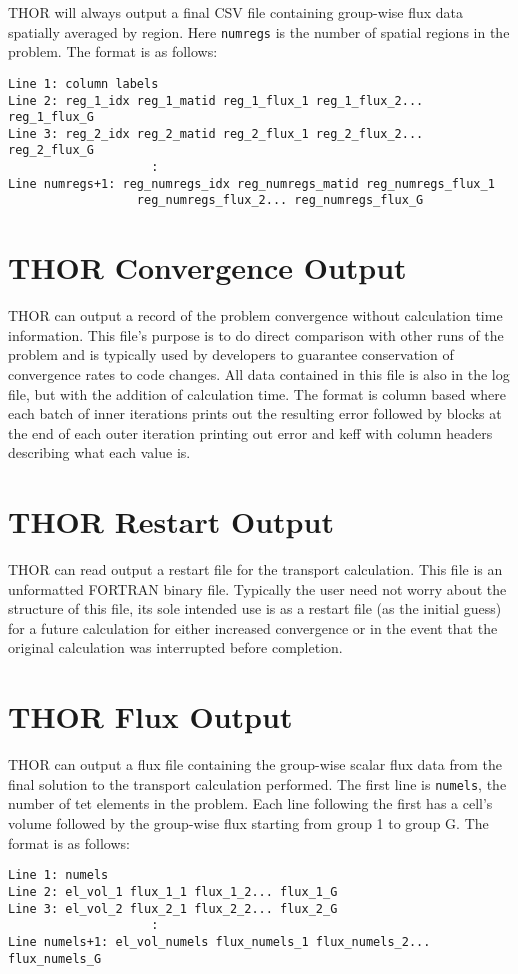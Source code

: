 THOR will always output a final CSV file containing group-wise flux data spatially averaged by region.
Here \verb"numregs" is the number of spatial regions in the problem.
The format is as follows:
\begin{verbatim}
Line 1: column labels
Line 2: reg_1_idx reg_1_matid reg_1_flux_1 reg_1_flux_2... reg_1_flux_G
Line 3: reg_2_idx reg_2_matid reg_2_flux_1 reg_2_flux_2... reg_2_flux_G
                    :
Line numregs+1: reg_numregs_idx reg_numregs_matid reg_numregs_flux_1
                  reg_numregs_flux_2... reg_numregs_flux_G
\end{verbatim}

\section{THOR Convergence Output}\label{ch:out:sec:conv}

THOR can output a record of the problem convergence without calculation time information.
This file's purpose is to do direct comparison with other runs of the problem and is typically used by developers to guarantee conservation of convergence rates to code changes.
All data contained in this file is also in the log file, but with the addition of calculation time.
The format is column based where each batch of inner iterations prints out the resulting error followed by blocks at the end of each outer iteration printing out error and keff with column headers describing what each value is.

\section{THOR Restart Output}\label{ch:out:sec:restart}

THOR can read output a restart file for the transport calculation.
This file is an unformatted FORTRAN binary file.
Typically the user need not worry about the structure of this file, its sole intended use is as a restart file (as the initial guess) for a future calculation for either increased convergence or in the event that the original calculation was interrupted before completion.

\section{THOR Flux Output}\label{ch:out:sec:flux}

THOR can output a flux file containing the group-wise scalar flux data from the final solution to the transport calculation performed.
The first line is \verb"numels", the number of tet elements in the problem.
Each line following the first has a cell's volume followed by the group-wise flux starting from group 1 to group G.
The format is as follows:
\begin{verbatim}
Line 1: numels
Line 2: el_vol_1 flux_1_1 flux_1_2... flux_1_G
Line 3: el_vol_2 flux_2_1 flux_2_2... flux_2_G
                    :
Line numels+1: el_vol_numels flux_numels_1 flux_numels_2... flux_numels_G
\end{verbatim}

